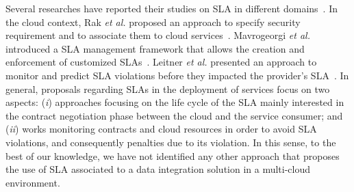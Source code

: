 \documentclass[11pt,a4paper,oneside]{report}
\begin{document}

Several researches have reported their studies on SLA in different domains~\cite{AlhamadDC11}. In the cloud context, Rak \textit{et al.} proposed an approach to specify security requirement and to associate them to cloud services~\cite{rak2013}. Mavrogeorgi \textit{et al.} introduced a SLA management framework that allows the creation and enforcement of customized SLAs~\cite{Mavrogeorgi2013}. Leitner \textit{et al.} presented an approach to monitor and predict SLA violations before they impacted the provider's SLA~\cite{Leitner2010}. In general, proposals regarding SLAs in the deployment of services focus on two aspects: (\textit{i}) approaches focusing on the life cycle of the SLA mainly interested in the contract negotiation phase between the cloud and the service consumer; and (\textit{ii}) works monitoring contracts and cloud resources in order to avoid SLA violations, and consequently penalties due to its violation. In this sense, to the best of our knowledge, we have not identified any other approach that proposes the use of SLA associated to a data integration solution in a multi-cloud environment.

\end{document}
